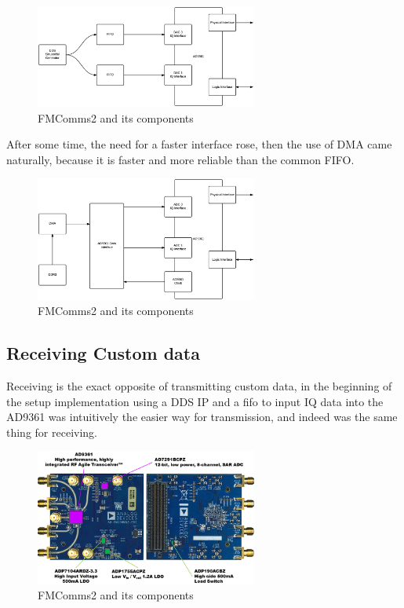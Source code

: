 
\begin{figure}[htbp]
    \centering
    \includegraphics[width=0.65\textwidth]{./figures/dac_fifo}
    \caption{ FMComms2 and its components
    \label{fig:fmcomm}}
\end{figure}

After some time, the need for a faster interface rose, then the use of DMA came
naturally, because it is faster and more reliable than the common FIFO.

\begin{figure}[htbp]
    \centering
    \includegraphics[width=0.65\textwidth]{./figures/dac_dma}
    \caption{ FMComms2 and its components
    \label{fig:fmcomm}}
\end{figure}

\subsection{Receiving Custom data}

Receiving is the exact opposite of transmitting custom data, in the beginning of
the setup implementation using a DDS IP and a fifo to input IQ data into the
AD9361 was intuitively the easier way for transmission, and indeed was the same
thing for receiving.

\begin{figure}[htbp]
    \centering
    \includegraphics[width=0.65\textwidth]{./figures/fmcomms2_pic}
    \caption{ FMComms2 and its components
    \label{fig:fmcomm}}
\end{figure}

